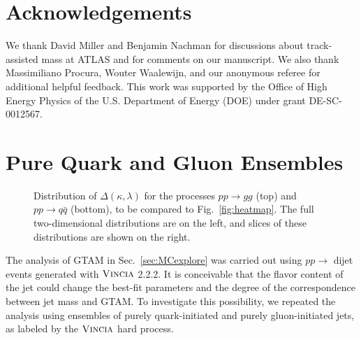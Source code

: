 \documentclass[letterpaper,11pt]{article}
\newcommand{\Fig}[1]{Fig.~\ref{#1}}
\newcommand{\Sec}[1]{Sec.~\ref{#1}}
\begin{document}
\section*{Acknowledgements}

We thank David Miller and Benjamin Nachman for discussions about track-assisted mass at ATLAS and for comments on our manuscript.
%
We also thank Massimiliano Procura, Wouter Waalewijn, and our anonymous referee for additional helpful feedback.
%
This work was supported by the Office of High Energy Physics of the U.S. Department of Energy (DOE) under grant DE-SC-0012567.


\appendix


\section{Pure Quark and Gluon Ensembles}
\label{app:pure-quark-gluon}




\begin{figure}[p]
	\centering
	
	\caption{\label{fig:pure-qg-distance}Distribution of $\Delta(\kappa,\lambda)$ for the processes $pp\rightarrow gg$ (top) and $pp\rightarrow q\bar{q}$ (bottom), to be compared to \Fig{fig:heatmap}. The full two-dimensional distributions are on the left, and slices of these distributions are shown on the right.}
\end{figure}




The analysis of GTAM in \Sec{sec:MCexplore} was carried out using $pp\rightarrow $ dijet events generated with $\textsc{Vincia}$ 2.2.2. 
%
It is conceivable that the flavor content of the jet could change the best-fit parameters and the degree of the correspondence between jet mass and GTAM. 
%
To investigate this possibility, we repeated the analysis using ensembles of purely quark-initiated and purely gluon-initiated jets, as labeled by the $\textsc{Vincia}$ hard process. 
\end{document}
